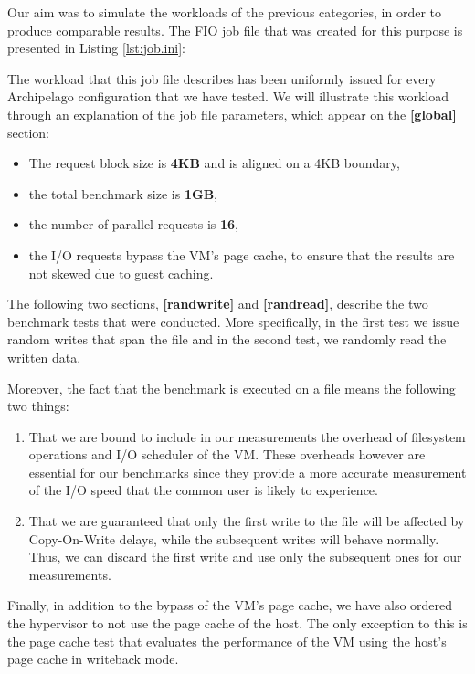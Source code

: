 Our aim was to simulate the workloads of the previous categories, in order to 
produce comparable results. The FIO job file that was created for this purpose 
is presented in Listing \ref{lst:job.ini}:


The workload that this job file describes has been uniformly issued for every
Archipelago configuration that we have tested. We will illustrate this workload 
through an explanation of the job file parameters, which appear on the 
\textbf{[global]} section:

\begin{itemize}
	\item The request block size is \textbf{4KB} and is aligned on a 4KB 
		boundary,
	\item the total benchmark size is \textbf{1GB},
	\item the number of parallel requests is \textbf{16},
	\item the I/O requests bypass the VM's page cache, to ensure that the 
		results are not skewed due to guest caching.
\end{itemize}			

The following two sections, \textbf{[randwrite]} and \textbf{[randread]}, 
describe the two benchmark tests that were conducted. More specifically, in the 
first test we issue random writes that span the file and in the second test, we 
randomly read the written data.

Moreover, the fact that the benchmark is executed on a file means the following 
two things:

\begin{enumerate}
	\item That we are bound to include in our measurements the overhead of 
		filesystem operations and I/O scheduler of the VM. These overheads 
		however are essential for our benchmarks since they provide a more 
		accurate measurement of the I/O speed that the common user is likely to 
		experience.
	\item That we are guaranteed that only the first write to the file will be 
		affected by Copy-On-Write delays, while the subsequent writes will 
		behave normally.  Thus, we can discard the first write and use only
		the subsequent ones for our measurements.
\end{enumerate}

Finally, in addition to the bypass of the VM's page cache, we have also ordered 
the hypervisor to not use the page cache of the host. The only exception to 
this is the page cache test that evaluates the performance of the VM using the 
host's page cache in writeback mode.

